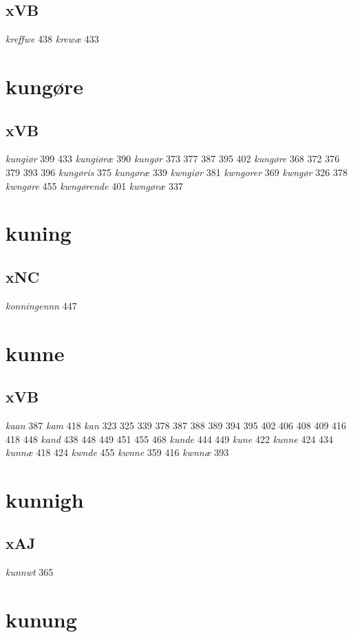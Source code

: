 \documentclass[a4paper,twocolumn]{article}
\begin{document}
\subsection{xVB}
\label{sec:org15bddc6}
\emph{kreffwe} 438 \emph{krewæ} 433 
\section{kungøre}
\label{sec:org82123b0}
\subsection{xVB}
\label{sec:org5d7e382}
\emph{kungiør} 399 433 \emph{kungiøræ} 390 \emph{kungør} 373 377 387 395 402 \emph{kungøre} 368 372 376 379 393 396 \emph{kungøris} 375 \emph{kungøræ} 339 \emph{kwngiør} 381 \emph{kwngorer} 369 \emph{kwngør} 326 378 \emph{kwngøre} 455 \emph{kwngørende} 401 \emph{kwngøræ} 337 
\section{kuning}
\label{sec:orga067b55}
\subsection{xNC}
\label{sec:org37ada82}
\emph{konningennn} 447 
\section{kunne}
\label{sec:org4c199af}
\subsection{xVB}
\label{sec:orgd53a0a5}
\emph{kaan} 387 \emph{kam} 418 \emph{kan} 323 325 339 378 387 388 389 394 395 402 406 408 409 416 418 448 \emph{kand} 438 448 449 451 455 468 \emph{kunde} 444 449 \emph{kune} 422 \emph{kunne} 424 434 \emph{kunnæ} 418 424 \emph{kwnde} 455 \emph{kwnne} 359 416 \emph{kwnnæ} 393 
\section{kunnigh}
\label{sec:org80ee3a6}
\subsection{xAJ}
\label{sec:org77689af}
\emph{kunnwt} 365 
\section{kunung}
\label{sec:org296bdee}
\end{document}
